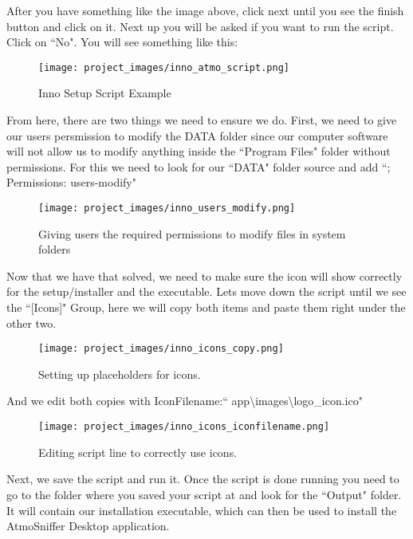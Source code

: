 	After you have something like the image above, click next until you see the finish button and click on it. Next up you will be asked if you want to run the script. Click on ``No".
	You will see something like this:

\begin{figure}[H]
\centering
\texttt{[image: project\_images/inno\_atmo\_script.png]}
 \caption{Inno Setup Script Example}
 \label{fig:inno atmo script}
\end{figure}

	From here, there are two things we need to ensure we do. First, we need to give our users persmission to modify the DATA folder since our computer software will not allow us to modify anything inside the ``Program Files" folder without permissions. For this we need to look for our ``DATA" folder source and add ``; Permissions: users-modify"

\begin{figure}[H]
\centering
\texttt{[image: project\_images/inno\_users\_modify.png]}
 \caption{Giving users the required permissions to modify files in system folders}
 \label{fig:inno users modify}
\end{figure}

	Now that we have that solved, we need to make sure the icon will show correctly for the setup/installer and the executable. Lets move down the script until we see the ``[Icons]" Group, here we will copy both items and paste them right under the other two.

\begin{figure}[H]
\centering
\texttt{[image: project\_images/inno\_icons\_copy.png]}
 \caption{Setting up placeholders for icons.}
 \label{fig:inno icons copy}
\end{figure}

	And we edit both copies with IconFilename:`` \textbraceleft app\textbraceright 	\textbackslash images\textbackslash logo\_icon.ico" 

\begin{figure}[H]
\centering
\texttt{[image: project\_images/inno\_icons\_iconfilename.png]}
 \caption{Editing script line to correctly use icons.}
 \label{fig:inno icons iconfilename}
\end{figure}

	Next, we save the script and run it. Once the script is done running you need to go to the folder where you saved your script at and look for the ``Output" folder. It will contain our installation executable, which can then be used to install the AtmoSniffer Desktop application.

